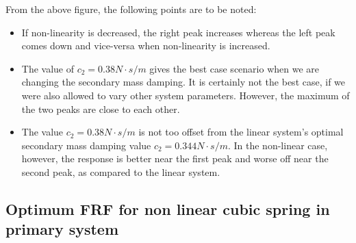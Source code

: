 From the above figure, the following points are to be noted:
\begin{itemize}
\item If non-linearity is decreased, the right peak increases whereas the left peak comes down and vice-versa when non-linearity is increased.

\item The value of $c_{2} = 0.38 N \cdot s/m$ gives the best case scenario when we are changing the secondary mass damping. It is certainly not the best case, if we were also allowed to vary other system parameters. However, the maximum of the two peaks are close to each other.
\item The value $c_{2} = 0.38 N \cdot s/m$ is not too offset from the linear system's optimal secondary mass damping value $c_{2} = 0.344 N \cdot s/m$. In the non-linear case, however, the response is better near the first peak and worse off near the second peak, as compared to the linear system.
\end{itemize}

\subsection{Optimum FRF for non linear cubic spring in primary system}

